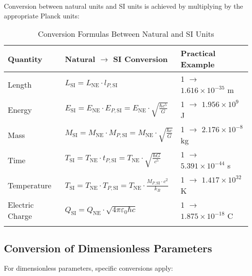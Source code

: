 \documentclass[12pt,a4paper]{article}
\begin{document}
	Conversion between natural units and SI units is achieved by multiplying by the appropriate Planck units:
	
	\begin{table}[ht]
		\centering
		\begin{adjustbox}{scale=1}
			\begin{tabular}{lll}
				\hline
				\textbf{Quantity} & \textbf{Natural $\to$ SI Conversion} & \textbf{Practical Example} \\
				\hline
				Length & $L_{\text{SI}} = L_{\text{NE}} \cdot l_{P,\text{SI}}$ & 1 $\to$ $1.616 \times 10^{-35}$ m \\
				Energy & $E_{\text{SI}} = E_{\text{NE}} \cdot E_{P,\text{SI}} = E_{\text{NE}} \cdot \sqrt{\frac{\hbar c^5}{G}}$ & 1 $\to$ $1.956 \times 10^9$ J \\
				Mass & $M_{\text{SI}} = M_{\text{NE}} \cdot M_{P,\text{SI}} = M_{\text{NE}} \cdot \sqrt{\frac{\hbar c}{G}}$ & 1 $\to$ $2.176 \times 10^{-8}$ kg \\
				Time & $T_{\text{SI}} = T_{\text{NE}} \cdot t_{P,\text{SI}} = T_{\text{NE}} \cdot \sqrt{\frac{\hbar G}{c^5}}$ & 1 $\to$ $5.391 \times 10^{-44}$ s \\
				Temperature & $T_{\text{SI}} = T_{\text{NE}} \cdot T_{P,\text{SI}} = T_{\text{NE}} \cdot \frac{M_{P,\text{SI}}\cdot c^2}{k_B}$ & 1 $\to$ $1.417 \times 10^{32}$ K \\
				Electric Charge & $Q_{\text{SI}} = Q_{\text{NE}} \cdot \sqrt{4\pi\varepsilon_0\hbar c}$ & 1 $\to$ $1.875 \times 10^{-18}$ C \\
				\hline
				\multicolumn{2}{c}{} \\
				\hline
			\end{tabular}
		\end{adjustbox}
		\caption{Conversion Formulas Between Natural and SI Units}
		\label{tab:conversion}
	\end{table}
	
	\subsection{Conversion of Dimensionless Parameters}
	
	For dimensionless parameters, specific conversions apply:
	
\end{document}
